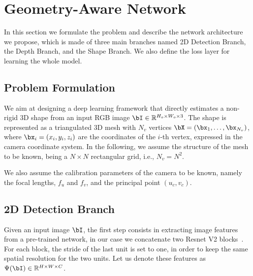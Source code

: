 \documentclass[10pt,twocolumn,letterpaper]{article}
\begin{document}
\section{Geometry-Aware Network}
In this section we formulate the problem and describe the network architecture we propose, which is made of three main branches named 2D Detection Branch, the Depth Branch, and the Shape Branch. We also define the loss layer for learning the whole model.



\subsection{Problem Formulation}
We aim at designing a deep learning framework that directly estimates a non-rigid 3D shape from an input RGB image $\bI\in\mathbb{R}^{H_o\times W_o \times 3}$. The  shape is represented as a triangulated 3D mesh with $N_v$ vertices $\bX=(\bx_1,\ldots,\bx_{N_v})$, where $\bx_i=(x_i,y_i,z_i)$ are the coordinates of the $i$-th vertex, expressed in the camera coordinate system. In the following, we assume the structure of the mesh to be known, being a $N\times N$ rectangular grid, i.e., $N_v=N^2$. 

We also assume the calibration parameters of the camera to be known, namely the focal lengths, $f_u$ and $f_v$, and the principal point $(u_c,v_c)$.

\subsection{2D Detection Branch}
Given an input image $\bI$, the first step consists in extracting image features from a pre-trained network, in our case we concatenate two Resnet V2 blocks~\cite{he2016identity}. For each block, the stride of the last unit is set to one, in order to keep the same spatial resolution for the two units. Let us denote these features as $\Psi(\bI)\in\mathbb{R}^{H\times W\times C}$.
\end{document}
